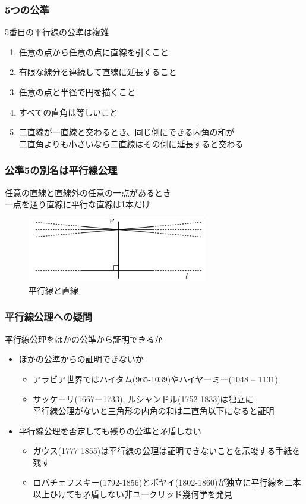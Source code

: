 \documentclass[unicode, 14pt, aspectratio=169]{beamer}
\begin{document}
\begin{frame}
  \frametitle{5つの公準}
  {\large 5番目の平行線の公準は複雑}
  \par
  \vspace{16pt}  
  \begin{enumerate}
  \item 任意の点から任意の点に直線を引くこと
  \item 有限な線分を連続して直線に延長すること
  \item 任意の点と半径で円を描くこと
  \item すべての直角は等しいこと
  \item 二直線が一直線と交わるとき、同じ側にできる内角の和が\\二直角よりも小さいなら二直線はその側に延長すると交わる
  \end{enumerate}
\end{frame}
\begin{frame}[t]
  \frametitle{公準5の別名は平行線公理}
  {\large 任意の直線と直線外の任意の一点があるとき\\一点を通り直線に平行な直線は1本だけ}
  \begin{figure}
    \includegraphics[width=0.7\textwidth]{images/axiom5.png}
    \caption{平行線と直線}
  \end{figure}
\end{frame}
\begin{frame}
  \frametitle{平行線公理への疑問}
  {\large 平行線公理をほかの公準から証明できるか}
  \begin{itemize}
  \item ほかの公準からの証明できないか
    \begin{itemize}
    \item アラビア世界ではハイタム(965-1039)やハイヤーミー(1048 – 1131)
    \item サッケーリ(1667ー1733), ルシャンドル(1752-1833)は独立に\\
      平行線公理がないと三角形の内角の和は二直角以下になると証明
    \end{itemize}
  \item 平行線公理を否定しても残りの公準と矛盾しない
    \begin{itemize}
    \item ガウス(1777-1855)は平行線の公理は証明できないことを示唆する手紙を残す
    \item ロバチェフスキー(1792-1856)とボヤイ(1802-1860)が独立に平行線を二本以上ひけても矛盾しない非ユークリッド幾何学を発見
    \end{itemize}
  \end{itemize}
\end{frame}
\end{document}
